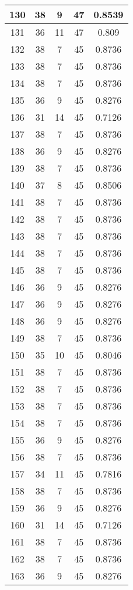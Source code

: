 \documentclass[letterpaper, 12pt]{article}
\begin{document}
\begin{longtable}{|c|c|c|c|c|}
\hline
130 & 38 & 9 & 47 & 0.8539 \\
\hline
131 & 36 & 11 & 47 & 0.809 \\
\hline
132 & 38 & 7 & 45 & 0.8736 \\
\hline
133 & 38 & 7 & 45 & 0.8736 \\
\hline
134 & 38 & 7 & 45 & 0.8736 \\
\hline
135 & 36 & 9 & 45 & 0.8276 \\
\hline
136 & 31 & 14 & 45 & 0.7126 \\
\hline
137 & 38 & 7 & 45 & 0.8736 \\
\hline
138 & 36 & 9 & 45 & 0.8276 \\
\hline
139 & 38 & 7 & 45 & 0.8736 \\
\hline
140 & 37 & 8 & 45 & 0.8506 \\
\hline
141 & 38 & 7 & 45 & 0.8736 \\
\hline
142 & 38 & 7 & 45 & 0.8736 \\
\hline
143 & 38 & 7 & 45 & 0.8736 \\
\hline
144 & 38 & 7 & 45 & 0.8736 \\
\hline
145 & 38 & 7 & 45 & 0.8736 \\
\hline
146 & 36 & 9 & 45 & 0.8276 \\
\hline
147 & 36 & 9 & 45 & 0.8276 \\
\hline
148 & 36 & 9 & 45 & 0.8276 \\
\hline
149 & 38 & 7 & 45 & 0.8736 \\
\hline
150 & 35 & 10 & 45 & 0.8046 \\
\hline
151 & 38 & 7 & 45 & 0.8736 \\
\hline
152 & 38 & 7 & 45 & 0.8736 \\
\hline
153 & 38 & 7 & 45 & 0.8736 \\
\hline
154 & 38 & 7 & 45 & 0.8736 \\
\hline
155 & 36 & 9 & 45 & 0.8276 \\
\hline
156 & 38 & 7 & 45 & 0.8736 \\
\hline
157 & 34 & 11 & 45 & 0.7816 \\
\hline
158 & 38 & 7 & 45 & 0.8736 \\
\hline
159 & 36 & 9 & 45 & 0.8276 \\
\hline
160 & 31 & 14 & 45 & 0.7126 \\
\hline
161 & 38 & 7 & 45 & 0.8736 \\
\hline
162 & 38 & 7 & 45 & 0.8736 \\
\hline
163 & 36 & 9 & 45 & 0.8276 \\

\end{longtable}
\end{document}
